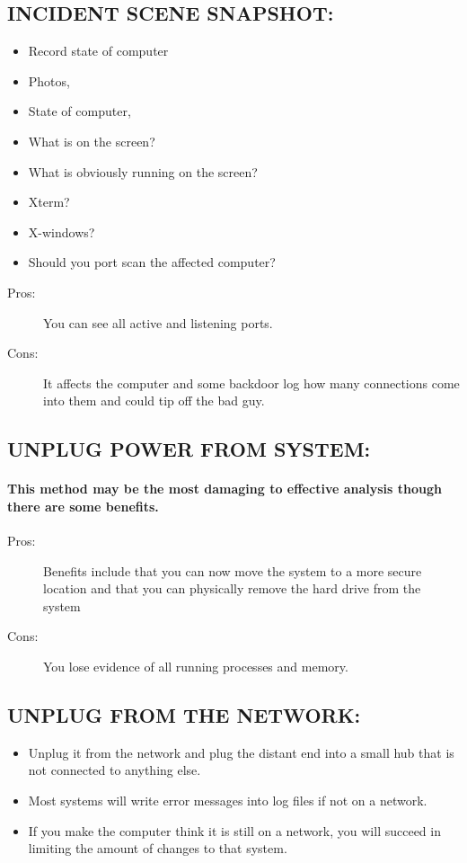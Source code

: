 \documentclass[10pt,british,english]{article}
\begin{document}
\subsection{INCIDENT SCENE SNAPSHOT:}
\begin{itemize}
\item Record state of computer
\item Photos, 
\item State of computer, 
\item What is on the screen?
\item What is obviously running on the screen?
\item Xterm?
\item X-windows?
\item Should you port scan the affected computer?
\end{itemize}
\begin{description}
\item [{Pros:}] You can see all active and listening ports.
\item [{Cons:}] It affects the computer and some backdoor log how many
connections come into them and could tip off the bad guy.
\end{description}

\subsection{UNPLUG POWER FROM SYSTEM:}

\paragraph{This method may be the most damaging to effective analysis though
there are some benefits.}
\begin{description}
\item [{Pros:}] Benefits include that you can now move the system to a
more secure location and that you can physically remove the hard drive
from the system
\item [{Cons:}] You lose evidence of all running processes and memory.
\end{description}
%

\subsection{UNPLUG FROM THE NETWORK:}
\begin{itemize}
\item Unplug it from the network and plug the distant end into a small hub
that is not connected to anything else.
\item Most systems will write error messages into log files if not on a
network. 
\item If you make the computer think it is still on a network, you will
succeed in limiting the amount of changes to that system.
\end{itemize}
\end{document}
